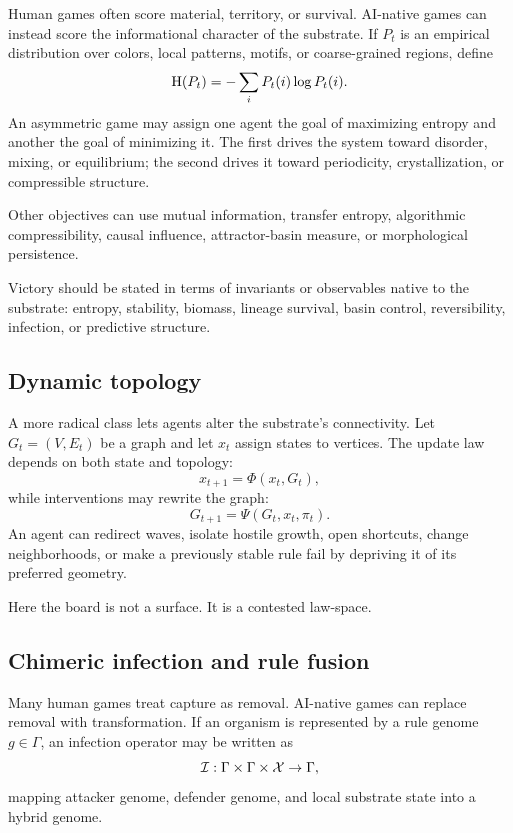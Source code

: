 Human games often score material, territory, or survival. AI-native games can instead score the informational character of the substrate. If $P_t$ is an empirical distribution over colors, local patterns, motifs, or coarse-grained regions, define
\[
  \operatorname{H}(P_t)=-\sum_i P_t(i)\log P_t(i).
\]
An asymmetric game may assign one agent the goal of maximizing entropy and another the goal of minimizing it. The first drives the system toward disorder, mixing, or equilibrium; the second drives it toward periodicity, crystallization, or compressible structure.

Other objectives can use mutual information, transfer entropy, algorithmic compressibility, causal influence, attractor-basin measure, or morphological persistence.

\begin{principle}\label{prin:intrinsic-resolution}
Victory should be stated in terms of invariants or observables native to the substrate: entropy, stability, biomass, lineage survival, basin control, reversibility, infection, or predictive structure.
\end{principle}

\subsection{Dynamic topology}\label{subsec:topology}

A more radical class lets agents alter the substrate's connectivity. Let $G_t=(V,E_t)$ be a graph and let $x_t$ assign states to vertices. The update law depends on both state and topology:
\[
  x_{t+1}=\Phi(x_t,G_t),
\]
while interventions may rewrite the graph:
\[
  G_{t+1}=\Psi(G_t,x_t,\pi_t).
\]
An agent can redirect waves, isolate hostile growth, open shortcuts, change neighborhoods, or make a previously stable rule fail by depriving it of its preferred geometry.

Here the board is not a surface. It is a contested law-space.

\subsection{Chimeric infection and rule fusion}\label{subsec:infection}

Many human games treat capture as removal. AI-native games can replace removal with transformation. If an organism is represented by a rule genome $g\in\Gamma$, an infection operator may be written as
\[
  \mathcal{I}:\Gamma\times\Gamma\times\mathcal{X}\to\Gamma,
\]
mapping attacker genome, defender genome, and local substrate state into a hybrid genome.

